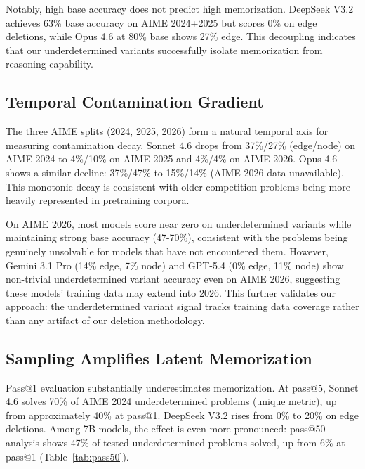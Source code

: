 \documentclass{article} %
\begin{document}
Notably, high base accuracy does not predict high memorization. DeepSeek V3.2 achieves 63\% base accuracy on AIME 2024+2025 but scores 0\% on edge deletions, while Opus 4.6 at 80\% base shows 27\% edge. This decoupling indicates that our underdetermined variants successfully isolate memorization from reasoning capability.


\subsection{Temporal Contamination Gradient}
\label{sec:temporal}

The three AIME splits (2024, 2025, 2026) form a natural temporal axis for measuring contamination decay. Sonnet 4.6 drops from 37\%/27\% (edge/node) on AIME 2024 to 4\%/10\% on AIME 2025 and 4\%/4\% on AIME 2026. Opus 4.6 shows a similar decline: 37\%/47\% to 15\%/14\% (AIME 2026 data unavailable). This monotonic decay is consistent with older competition problems being more heavily represented in pretraining corpora.

On AIME 2026, most models score near zero on underdetermined variants while maintaining strong base accuracy (47-70\%), consistent with the problems being genuinely unsolvable for models that have not encountered them. However, Gemini 3.1 Pro (14\% edge, 7\% node) and GPT-5.4 (0\% edge, 11\% node) show non-trivial underdetermined variant accuracy even on AIME 2026, suggesting these models' training data may extend into 2026. This further validates our approach: the underdetermined variant signal tracks training data coverage rather than any artifact of our deletion methodology.



\subsection{Sampling Amplifies Latent Memorization}
\label{sec:sampling}

Pass@1 evaluation substantially underestimates memorization. At pass@5, Sonnet 4.6 solves 70\% of AIME 2024 underdetermined problems (unique metric), up from approximately 40\% at pass@1. DeepSeek V3.2 rises from 0\% to 20\% on edge deletions. Among 7B models, the effect is even more pronounced: pass@50 analysis shows 47\% of tested underdetermined problems solved, up from 6\% at pass@1 (Table~\ref{tab:pass50}).
\end{document}
